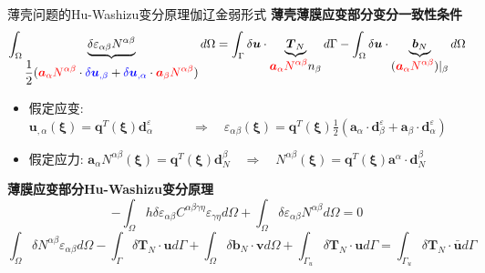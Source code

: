 \begin{frame}{薄壳问题的Hu-Washizu变分原理伽辽金弱形式}
    \textbf{薄壳薄膜应变部分变分一致性条件}
    \begin{equation*}
        \int_\Omega \underbrace{\delta \varepsilon_{\alpha\beta} N^{\alpha\beta}}_{\displaystyle \frac{1}{2}({\color{red}\boldsymbol a_{\alpha} N^{\alpha\beta}} \cdot {\color{blue}\delta \boldsymbol u_{,\beta}} + {\color{blue}\delta \boldsymbol u_{,\alpha}} \cdot {\color{red}\boldsymbol a_\beta N^{\alpha\beta}})} d\Omega = \int_\Gamma \delta \boldsymbol u \cdot \underbrace{\boldsymbol T_N}_{\displaystyle {\color{red} \boldsymbol a_\alpha N^{\alpha\beta}} n_\beta} d\Gamma - \int_\Omega \delta \boldsymbol u \cdot \underbrace{\boldsymbol b_N}_{\displaystyle ({\color{red}\boldsymbol a_\alpha N^{\alpha\beta}})\vert_\beta} d\Omega
    \end{equation*}

    \vspace{-10pt}

    \begin{itemize}
    \item 假定应变:
        $\displaystyle \boldsymbol u_{,\alpha}(\boldsymbol \xi) = \boldsymbol q^T(\boldsymbol \xi) \boldsymbol d_\alpha^{\varepsilon}
        \qquad \quad \! \Rightarrow \quad
        \varepsilon_{\alpha\beta}(\boldsymbol \xi) = \boldsymbol q^T(\boldsymbol \xi)\frac{1}{2}(\boldsymbol a_\alpha \cdot \boldsymbol d_\beta^\varepsilon + \boldsymbol a_\beta \cdot \boldsymbol d^\varepsilon_\alpha)$
    \item 假定应力:
        $\displaystyle \boldsymbol a_\alpha N^{\alpha\beta}(\boldsymbol \xi) = \boldsymbol q^T(\boldsymbol \xi) \boldsymbol d_N^\beta
        \quad\Rightarrow \quad
        N^{\alpha\beta}(\boldsymbol \xi) = \boldsymbol q^T(\boldsymbol \xi) \boldsymbol a^\alpha \cdot \boldsymbol d_N^\beta$
    \end{itemize}
    \textbf{薄膜应变部分Hu-Washizu变分原理}
    {\footnotesize
    \begin{equation*}
        - \int_\Omega h \delta \varepsilon_{\alpha\beta} C^{\alpha\beta\gamma\eta}\varepsilon_{\gamma\eta}d\Omega 
        + \int_\Omega \delta \varepsilon_{\alpha\beta} N^{\alpha\beta} d\Omega = 0
    \end{equation*}
    \begin{equation*}
        \int_\Omega \delta N^{\alpha\beta} \varepsilon_{\alpha\beta} d\Omega
        - \int_\Gamma \delta \boldsymbol T_N \cdot \boldsymbol u d\Gamma 
        + \int_\Omega \delta \boldsymbol b_N \cdot \boldsymbol v d\Omega 
        + \int_{\Gamma_u} \delta \boldsymbol T_N \cdot \boldsymbol u d\Gamma 
        = \int_{\Gamma_u} \delta \boldsymbol T_N \cdot \bar{\boldsymbol u} d\Gamma 
    \end{equation*}}
\end{frame}

